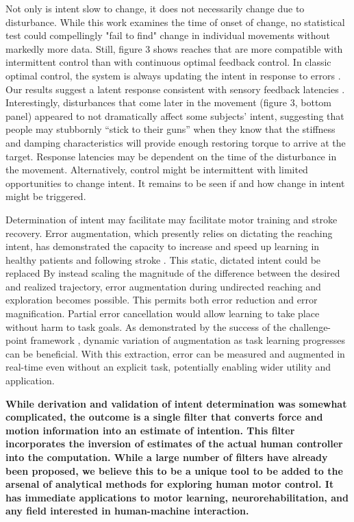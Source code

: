 \documentclass[10pt]{article}
\begin{document}
Not only is intent slow to change, it does not necessarily change due to disturbance. While this work examines the time of onset of change, no statistical test could compellingly "fail to find" change in individual movements without markedly more data. Still, figure 3 shows reaches that are more compatible with intermittent control than with continuous optimal feedback control. In classic optimal control, the system is always updating the intent in response to errors \cite{todorov2002optimal}. Our results suggest a latent response consistent with sensory feedback latencies \cite{pruszynski2012optimal}. Interestingly, disturbances that come later in the movement (figure 3, bottom panel) appeared to not dramatically affect some subjects' intent, suggesting that people may stubbornly “stick to their guns” when they know that the stiffness and damping characteristics will provide enough restoring torque to arrive at the target. Response latencies may be dependent on the time of the disturbance in the movement. Alternatively, control might be intermittent \cite{gawthrop2011intermittent} with limited opportunities to change intent. It remains to be seen if and how change in intent might be triggered. 

Determination of intent may facilitate may facilitate motor training and stroke recovery. Error augmentation, which presently relies on dictating the reaching intent, has demonstrated the capacity to increase and speed up learning in healthy patients \cite{patton2004robot} and following stroke \cite{patton2006evaluation}. This static, dictated intent could be replaced By instead scaling the magnitude of the difference between the desired and realized trajectory, error augmentation during undirected reaching and exploration becomes possible. This permits both error reduction and error magnification. Partial error cancellation would allow learning to take place without harm to task goals. As demonstrated by the success of the challenge-point framework \cite{guadagnoli2004challenge}, dynamic variation of augmentation as task learning progresses can be beneficial. With this extraction, error can be measured and augmented in real-time even without an explicit task, potentially enabling wider utility and application. 

\textbf{While derivation and validation of intent determination was somewhat complicated, the outcome is a single filter that converts force and motion information into an estimate of intention. This filter incorporates the inversion of estimates of the actual human controller into the computation. While a large number of filters have already been proposed, we believe this to be a unique tool to be added to the arsenal of analytical methods for exploring human motor control. It has immediate applications to motor learning, neurorehabilitation, and any field interested in human-machine interaction.}
\end{document}
